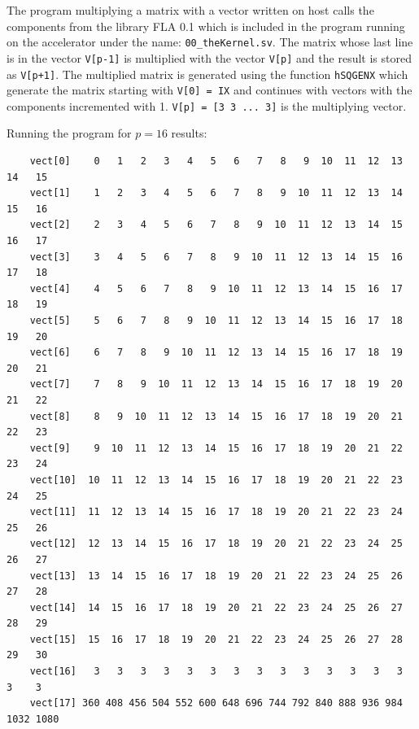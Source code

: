 \begin{exemplu}
The program multiplying a matrix with a vector written on host calls the components from the library FLA 0.1 which is included in the program running on the accelerator under the name: {\tt 00\_theKernel.sv}. The matrix whose last line is in the vector {\tt V[p-1]} is multiplied with the vector {\tt V[p]} and the result is stored as {\tt V[p+1]}. The multiplied matrix is generated using the function {\tt hSQGENX} which generate the  matrix starting with {\tt V[0] = IX} and continues with vectors with the components incremented with 1. {\tt V[p] = [3 3  ... 3]} is the multiplying vector.  

{\em 
{}
}

{\em 
{}
}
Running the program for $p = 16$ results:
\begin{verbatim}
    vect[0]    0   1   2   3   4   5   6   7   8   9  10  11  12  13   14   15
    vect[1]    1   2   3   4   5   6   7   8   9  10  11  12  13  14   15   16
    vect[2]    2   3   4   5   6   7   8   9  10  11  12  13  14  15   16   17
    vect[3]    3   4   5   6   7   8   9  10  11  12  13  14  15  16   17   18
    vect[4]    4   5   6   7   8   9  10  11  12  13  14  15  16  17   18   19
    vect[5]    5   6   7   8   9  10  11  12  13  14  15  16  17  18   19   20
    vect[6]    6   7   8   9  10  11  12  13  14  15  16  17  18  19   20   21
    vect[7]    7   8   9  10  11  12  13  14  15  16  17  18  19  20   21   22
    vect[8]    8   9  10  11  12  13  14  15  16  17  18  19  20  21   22   23
    vect[9]    9  10  11  12  13  14  15  16  17  18  19  20  21  22   23   24
    vect[10]  10  11  12  13  14  15  16  17  18  19  20  21  22  23   24   25
    vect[11]  11  12  13  14  15  16  17  18  19  20  21  22  23  24   25   26
    vect[12]  12  13  14  15  16  17  18  19  20  21  22  23  24  25   26   27
    vect[13]  13  14  15  16  17  18  19  20  21  22  23  24  25  26   27   28
    vect[14]  14  15  16  17  18  19  20  21  22  23  24  25  26  27   28   29
    vect[15]  15  16  17  18  19  20  21  22  23  24  25  26  27  28   29   30
    vect[16]   3   3   3   3   3   3   3   3   3   3   3   3   3   3    3    3
    vect[17] 360 408 456 504 552 600 648 696 744 792 840 888 936 984 1032 1080
\end{verbatim}


\end{exemplu}
